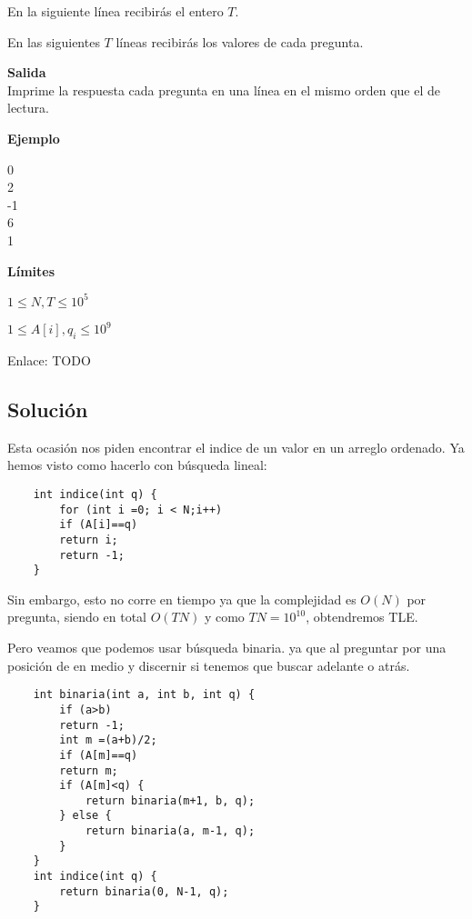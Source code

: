 En la siguiente línea recibirás el entero \(T\).

En las siguientes \(T\) líneas recibirás los valores de cada pregunta.

\textbf{Salida}\\
Imprime la respuesta cada pregunta en una línea en el mismo orden que el de lectura.

\textbf{Ejemplo}\\
\begin{casebox2}
	{
		0\\
		2\\
		-1\\
		6\\
		1		
	}
\end{casebox2}

\textbf{Límites}
\begin{plimits}
	\item \(1\leq N,T \leq 10^5 \)
	\item \(1\leq A[i], q_i \leq 10^9 \)
\end{plimits}

Enlace: TODO

\subsection*{Solución}
Esta ocasión nos piden encontrar el indice de un valor en un arreglo ordenado. Ya hemos visto como hacerlo con búsqueda lineal:

\begin{lstlisting}
	int indice(int q) {
		for (int i =0; i < N;i++) 
		if (A[i]==q)
		return i;
		return -1;
	}
\end{lstlisting}

Sin embargo, esto no corre en tiempo ya que la complejidad es \(O(N)\) por pregunta, siendo en total \(O(TN)\) y como \(TN=10^{10}\), obtendremos TLE.

Pero veamos que podemos usar búsqueda binaria. ya que al preguntar por una posición de en medio y discernir si tenemos que buscar adelante o atrás.

\begin{lstlisting}
	int binaria(int a, int b, int q) {
		if (a>b)
		return -1;
		int m =(a+b)/2;
		if (A[m]==q)
		return m;
		if (A[m]<q) {
			return binaria(m+1, b, q);
		} else {
			return binaria(a, m-1, q);
		}		
	}
	int indice(int q) {
		return binaria(0, N-1, q);
	}
\end{lstlisting}

